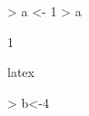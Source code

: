 \documentclass{article}
\begin{document}


\begin{Schunk}
\begin{Sinput}
> a <- 1
> a
\end{Sinput}
\begin{Soutput}
[1] 1
\end{Soutput}
\end{Schunk}

latex

\begin{Schunk}
\begin{Sinput}
> b<-4
\end{Sinput}
\end{Schunk}
\end{document}
